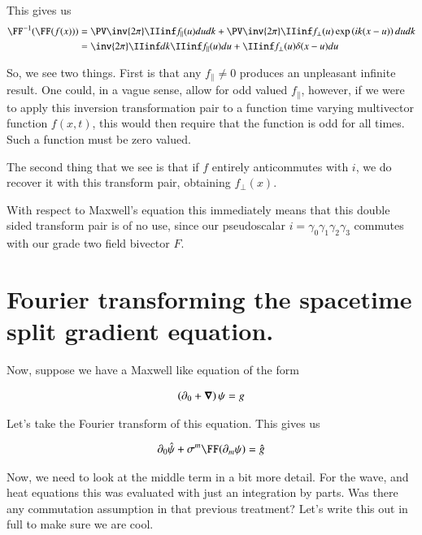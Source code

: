 This gives us
\begin{align*}
\FF^{-1}(\FF(f(x)))
&=
\PV \inv{{2\pi}} \IIinf f_\parallel(u) du dk 
+\PV \inv{{2\pi}} \IIinf f_\perp(u) \exp\left( i k (x -u) \right) du dk \\
&=
\inv{{2\pi}} \IIinf dk \IIinf f_\parallel(u) du +\IIinf f_\perp(u) \delta( x -u ) du \\
\end{align*}

So, we see two things.  First is that any $f_\parallel \ne 0$ produces an unpleasant infinite result.  One could, in a vague sense, allow for odd valued $f_\parallel$, however, if we were to apply this inversion transformation pair to a function time varying multivector function $f(x,t)$, this would then require that the function is odd for all times.  Such a function must be zero valued. %

The second thing that we see is that if $f$ entirely anticommutes with $i$, we do recover it with this transform pair, obtaining $f_\perp(x)$.

With respect to Maxwell's equation
this immediately means that this double sided transform pair is of no use, since our pseudoscalar $i = \gamma_0 \gamma_1\gamma_2 \gamma_3$ commutes with our grade two 
field bivector $F$.

\section{Fourier transforming the spacetime split gradient equation. }

Now, suppose we have a Maxwell like equation of the form

\begin{align}\label{eqn:firstorder_fourier_maxwell:spacetimeGradientEquation}
\left(\partial_0 + \boldsymbol{\nabla} \right) \psi = g
\end{align}

Let's take the Fourier transform of this equation.  This gives us

\begin{align*}
\partial_0 \hat{\psi} + \sigma^m \FF(\partial_m \psi) = \hat{g}
\end{align*}

Now, we need to look at the middle term in a bit more detail.  For the wave, and heat equations this was evaluated with just an integration
by parts.  Was there any commutation assumption in that previous treatment?  Let's write this out in full to make sure we are cool.

